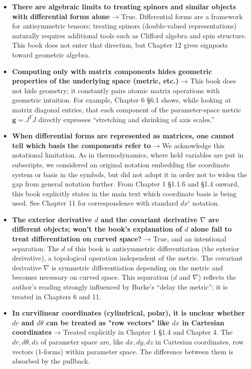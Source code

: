 \documentclass[a4paper,12pt,openany]{book}
\begin{document}
\begin{itemize}
  Chapter 11.
\item
  \textbf{There are algebraic limits to treating spinors and similar objects with differential forms alone}
  → True. Differential forms are a framework for antisymmetric tensors;
  treating spinors (double-valued representations) naturally requires
  additional tools such as Clifford algebra and spin structure. This
  book does not enter that direction, but Chapter 12 gives signposts
  toward geometric algebra.
\item
  \textbf{Computing only with matrix components hides geometric properties of the underlying space (metric, etc.)}
  → This book does not hide geometry; it constantly pairs atomic matrix
  operations with geometric intuition. For example, Chapter 6 §6.1
  shows, while looking at matrix diagonal entries, that each component
  of the parameter-space metric \(\mathbf{g}=J^T J\) directly expresses
  ``stretching and shrinking of axis scales.''
\item
  \textbf{When differential forms are represented as matrices, one cannot tell which basis the components refer to}
  → We acknowledge this notational limitation. As in thermodynamics,
  where held variables are put in subscripts, we considered an original
  notation embedding the coordinate system or basis in the symbols, but
  did not adopt it in order not to widen the gap from general notation
  further. From Chapter 1 §1.1.6 and §1.4 onward, this book explicitly
  states in the main text which coordinate basis is being used. See
  Chapter 11 for correspondence with standard \(dx^i\) notation.
\item
  \textbf{The exterior derivative $d$ and the covariant derivative $\nabla$ are different objects; won't the book's explanation of $d$ alone fail to treat differentiation on curved space?}
  → True, and an intentional separation. The \(d\) of this book is
  antisymmetric differentiation (the exterior derivative), a topological
  operation independent of the metric. The covariant derivative
  \(\nabla\) is symmetric differentiation depending on the metric and
  becomes necessary on curved space. This separation (\(d\) and
  \(\nabla\)) reflects the author's reading strongly influenced by
  Burke's ``delay the metric''; it is treated in Chapters 6 and 11.
\item
  \textbf{In curvilinear coordinates (cylindrical, polar), it is unclear whether $dr$ and $d\theta$ can be treated as "row vectors" like $dx$ in Cartesian coordinates}
  → Treated explicitly in Chapter 1 §1.4 and Chapter 4. The
  \(dr,d\theta,dz\) of parameter space are, like \(dx,dy,dz\) in
  Cartesian coordinates, row vectors (1-forms) within parameter space.
  The difference between them is absorbed by the pullback.
\end{itemize}
\end{document}
